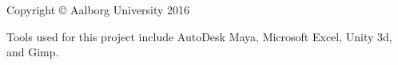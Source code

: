 \thispagestyle{empty}
{\small
\strut\vfill %
\noindent Copyright \copyright{} Aalborg University 2016\par
\vspace{0.2cm}
\noindent Tools used for this project include AutoDesk Maya, Microsoft Excel, Unity 3d, and Gimp.
}
\clearpage

